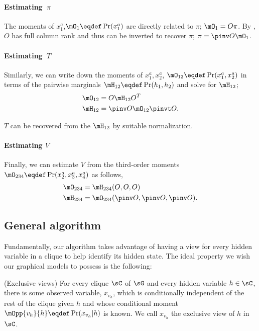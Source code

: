 
\paragraph{Estimating $~\pi$}

The moments of $x^a_1$,$\mO_1 \eqdef \Pr(x^a_1)$ are directly related to
  $\pi$; $\mO_1 = O \pi$. 
By , $O$ has full column rank and thus can be
  inverted to recover $\pi$; $\pi = \pinv O \mO_1$.

\paragraph{Estimating $~T$}

Similarly, we can write down the moments of $x^a_1, x^a_2$, $\mO_{12}
  \eqdef \Pr(x^a_1, x^a_2)$ in terms of the pairwise marginals $\mH_{12}
  \eqdef \Pr(h_1, h_2)$ and solve for $\mH_{12}$;
\begin{align*}
  \mO_{12} &= O \mH_{12} O^T \\
  \mH_{12} &= \pinv O \mO_{12} \pinvt O.
\end{align*}

$T$ can be recovered from the $\mH_{12}$ by suitable normalization.

\paragraph{Estimating $V$}

Finally, we can estimate $V$ from the third-order moments $\mO_{234} \eqdef \Pr(x^a_2, x^a_3, x^a_4)$ as
follows,
\begin{align*}
  \mO_{234} &= \mH_{234}(O, O, O) \\
  \mH_{234} &= \mO_{234}(\pinv O, \pinv O, \pinv O).
\end{align*}

\subsection{General algorithm}

Fundamentally, our algorithm takes advantage of having a view for every
  hidden variable in a clique to help identify its hidden state. The
  ideal property we wish our graphical models to possess is the
  following:
\begin{property}(Exclusive views)
  \label{prop:exclusive-views}
For every clique $\sC$ of $\sG$ and every hidden variable $h \in \sC$,
  there is some observed variable, $x_{v_h}$, which is conditionally
  independent of the rest of the clique given $h$ and whose conditional
  moment $\mOpp{v_h}{h} \eqdef \Pr(x_{v_h} | h)$ is known. 
We call $x_{v_h}$ the exclusive view of $h$ in $\sC$.
\end{property}

